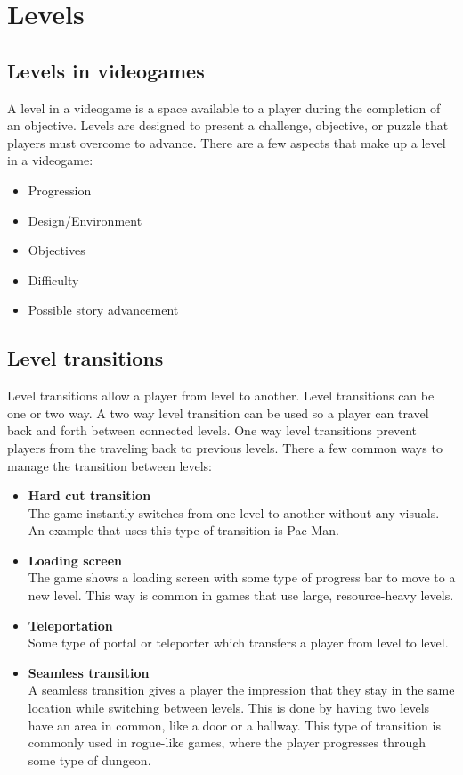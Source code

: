 \section{Levels}
\subsection{Levels in videogames}
A level in a videogame is a space available to a player during
the completion of an objective. Levels are designed to present a challenge,
objective, or puzzle that players must overcome to advance.
There are a few aspects that make up a level in a videogame:
\begin{itemize}
    \item Progression
    \item Design/Environment
    \item Objectives
    \item Difficulty
    \item Possible story advancement
\end{itemize}

\subsection{Level transitions}
Level transitions allow a player from level to another.
Level transitions can be one or two way.
A two way level transition can be used so a player can travel back and forth between connected levels.
One way level transitions prevent players from the traveling back to previous levels.
There a few common ways to manage the transition between levels:
\begin {itemize}
\item \textbf{Hard cut transition} \\
The game instantly switches from one level to another without any visuals.
An example that uses this type of transition is Pac-Man.
\item \textbf{Loading screen} \\
The game shows a loading screen with some type of progress bar to move to a new level.
This way is common in games that use large, resource-heavy levels.
\item \textbf{Teleportation} \\
Some type of portal or teleporter which transfers a player from level to level.
\item \textbf{Seamless transition} \\
A seamless transition gives a player the impression that they stay in the same location while switching between levels.
This is done by having two levels have an area in common, like a door or a hallway.
This type of transition is commonly used in rogue-like games, where the player progresses through some type of dungeon.
\end{itemize}

